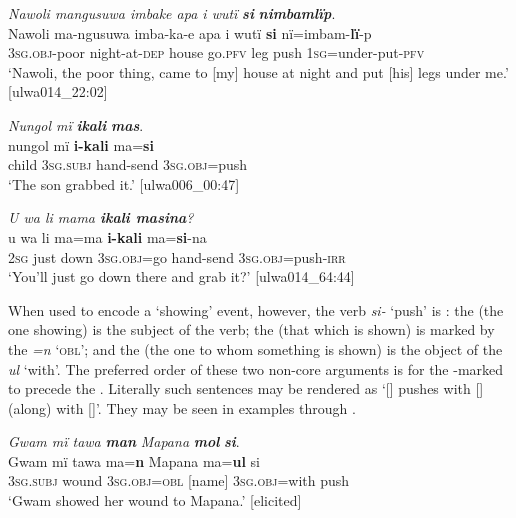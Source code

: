 \ea%
    \label{ex:clause:51}
          \textit{Nawoli mangusuwa imbake apa i wutï} \textbf{\textit{si}} \textbf{\textit{nimbamlïp}}.\\
\gll Nawoli  ma-ngusuwa  imba-ka-e    apa    i    wutï  \textbf{si}     nï=imbam-\textbf{lï}{}-p\\
    [name]  3\textsc{sg.obj{}-}poor  night-at-\textsc{dep}  house  go.\textsc{pfv}  leg    push    1\textsc{sg}=under-put-\textsc{pfv}\\
\glt `Nawoli, the poor thing, came to [my] house at night and put [his] legs under me.’ [ulwa014\_22:02]
\z

\ea%
    \label{ex:clause:52}
          \textit{Nungol mï} \textbf{\textit{ikali}} \textbf{\textit{mas}}.\\
\gll nungol  mï      \textbf{i-kali}    ma=\textbf{si}\\
    child  3\textsc{sg.subj}  hand-send  \textsc{3sg.obj}=push\\
\glt `The son grabbed it.’  [ulwa006\_00:47]
\z

\newpage

\ea%
    \label{ex:clause:53}
          \textit{U wa li mama \textbf{ikali masina}?}\\
\gll u    wa  li    ma=ma    \textbf{i-kali}    ma=\textbf{si}{}-na\\
    \textsc{2sg}  just  down  \textsc{3sg.obj}=go  hand-send  \textsc{3sg.obj}=push-\textsc{irr}\\
\glt `You’ll just go down there and grab it?’ [ulwa014\_64:44]
\z

  When used to encode a ‘showing’ event, however, the verb \textit{si-} ‘push’ is : the  (the one showing) is the subject of the verb; the  (that which is shown) is marked by the  \textit{=n} ‘\textsc{obl}’; and the  (the one to whom something is shown) is the object of the  \textit{ul} ‘with’. The preferred order of these two non-core arguments is for the -marked  to precede the . Literally such sentences may be rendered as ‘[] pushes with [] (along) with []’. They may be seen in examples  through .


\ea%
    \label{ex:clause:54}
          \textit{Gwam mï tawa} \textbf{\textit{man}} \textit{Mapana} \textbf{\textit{mol}} \textbf{\textit{si}}.\\
\gll Gwam  mï      tawa  ma=\textbf{n}      Mapana  ma=\textbf{ul} si\\
    [name]  \textsc{3sg.subj}  wound  3\textsc{sg.obj=obl}  [name]    3\textsc{sg.obj}=with    push\\
\glt `Gwam showed her wound to Mapana.’ [elicited]
\z

